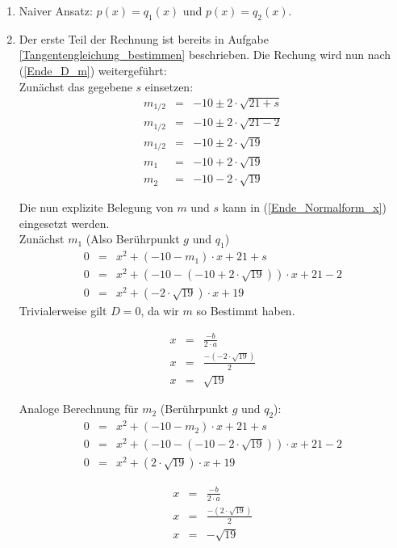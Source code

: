 \documentclass{scrartcl}
\begin{document}
\begin{enumerate}
\begin{enumerate}
			\item Naiver Ansatz: $p(x) = q_1(x)$ und $p(x) = q_2(x)$. \\
			\item 
				Der erste Teil der Rechnung ist bereits in Aufgabe \ref{Tangentengleichung_bestimmen} beschrieben. Die Rechung wird nun nach (\ref{Ende_D_m}) weitergeführt: \\
				
				Zunächst das gegebene $s$ einsetzen:
				\begin{eqnarray}
					m_{1/2} &=& -10 \pm 2 \cdot \sqrt{21+s} \\
					m_{1/2} &=& -10 \pm 2 \cdot \sqrt{21-2} \\
					m_{1/2} &=& -10 \pm 2 \cdot \sqrt{19} \\
					m_1 &=& -10 + 2 \cdot \sqrt{19} \label{m_1} \\
					m_2 &=& -10 - 2 \cdot \sqrt{19}
				\end{eqnarray}
				
				Die nun explizite Belegung von $m$ und $s$ kann in (\ref{Ende_Normalform_x}) eingesetzt werden. \\
				
				Zunächst $m_1$ (Also Berührpunkt $g$ und $q_1$)
				\begin{eqnarray}
					0 &=& x^2+(-10-m_{1})\cdot x+21+s \\
					0 &=& x^2+(-10- (-10 + 2 \cdot \sqrt{19}))\cdot x+21-2 \\
					0 &=& x^2+(- 2 \cdot \sqrt{19})\cdot x+19
				\end{eqnarray}
				Trivialerweise gilt $D = 0$, da wir $m$ so Bestimmt haben.
				
				\begin{eqnarray}
					x&=& \frac{-b}{2 \cdot a} \\
					x&=& \frac{-(-2 \cdot \sqrt{19})}{2} \\
					x&=& \sqrt{19}
				\end{eqnarray}
				
				Analoge Berechnung für $m_2$ (Berührpunkt $g$ und $q_2$):
				\begin{eqnarray}
					0 &=& x^2+(-10-m_{2})\cdot x+21+s \\
					0 &=& x^2+(-10- (-10 - 2 \cdot \sqrt{19}))\cdot x+21-2 \\
					0 &=& x^2+(2 \cdot \sqrt{19})\cdot x+19
				\end{eqnarray}
				
				\begin{eqnarray}
					x&=& \frac{-b}{2 \cdot a} \\
					x&=& \frac{-(2 \cdot \sqrt{19})}{2} \\
					x&=& -\sqrt{19}
				\end{eqnarray}
				

\end{enumerate}
\end{enumerate}
\end{document}
